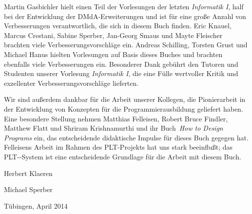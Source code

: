 Martin Gasbichler hielt einen Teil der Vorlesungen der letzten
\textit{Informatik I}, half bei der Entwicklung der DMdA-Erweiterungen
und ist für eine große Anzahl von Verbesserungen verantwortlich, die
sich in diesem Buch finden.  Eric Knauel, Marcus Crestani, Sabine
Sperber, Jan-Georg Smaus und Mayte Fleischer brachten viele Verbesserungsvorschläge
ein.  Andreas Schilling, Torsten Grust und Michael Hanus hielten
Vorlesungen auf Basis dieses Buches und brachten ebenfalls viele
Verbesserungen ein.
Besonderer Dank gebührt den Tutoren und Studenten unserer Vorlesung
\textit{Informatik I}, die eine
Fülle wertvoller Kritik und exzellenter Verbesserungsvorschläge
lieferten.

Wir sind außerdem dankbar für die Arbeit unserer Kollegen, die
Pionierarbeit in der Entwicklung von Konzepten für die
Programmierausbildung geliefert haben.  Eine besondere
Stellung nehmen Matthias Felleisen, Robert Bruce Findler, Matthew
Flatt und Shriram Krishnamurthi und ihr Buch~\textit{How to Design
  Programs} \cite{FelleisenFindlerFlattKrishnamurthi2001} ein, das
entscheidende didaktische Impulse für dieses Buch gegegen hat.
Felleisens Arbeit im Rahmen des PLT-Projekts hat uns stark beeinflußt;
das PLT-\drscheme{}-System ist eine entscheidende Grundlage für die
Arbeit mit diesem Buch.

\begin{flushright}
  Herbert Klaeren

  Michael Sperber

  Tübingen, April 2014
\end{flushright}


\newpage

\thispagestyle{empty}


